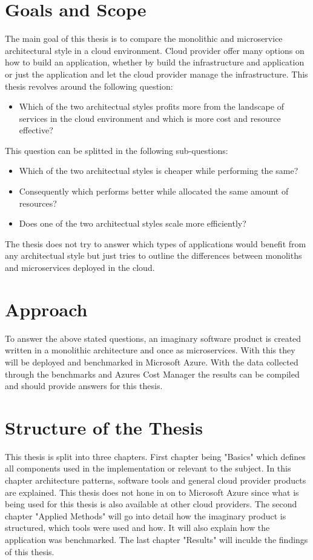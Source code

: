\documentclass[BIF,Master,nenglish]{twbook}%
\begin{document}
\section{Goals and Scope}
The main goal of this thesis is to compare the monolithic and microservice architectural style in a cloud environment. Cloud provider offer many options on how to build an application, whether by build the infrastructure and application or just the application and let the cloud provider manage the infrastructure. This thesis revolves around the following question:

\begin{itemize}
  \item Which of the two architectual styles profits more from the landscape of services in the cloud environment and which is more cost and resource effective?
\end{itemize}

\noindent
This question can be splitted in the following sub-questions:

\begin{itemize}
  \item Which of the two architectual styles is cheaper while performing the same?
  \item Consequently which performs better while allocated the same amount of resources?
  \item Does one of the two architectual styles scale more efficiently?
\end{itemize}

The thesis does not try to answer which types of applications would benefit from any architectual style but just tries to outline the differences between monoliths and microservices deployed in the cloud.

\section{Approach}
To answer the above stated questions, an imaginary software product is created written in a monolithic architecture and once as microservices. With this they will be deployed and benchmarked in Microsoft Azure. With the data collected through the benchmarks and Azures Cost Manager the results can be compiled and should provide answers for this thesis.

\section{Structure of the Thesis}
This thesis is split into three chapters. First chapter being "Basics" which defines all components used in the implementation or relevant to the subject. In this chapter architecture patterns, software tools and general cloud provider products are explained. This thesis does not hone in on to Microsoft Azure since what is being used for this thesis is also available at other cloud providers. The second chapter "Applied Methods" will go into detail how the imaginary product is structured, which tools were used and how. It will also explain how the application was benchmarked. The last chapter "Results" will inculde the findings of this thesis.
\end{document}
